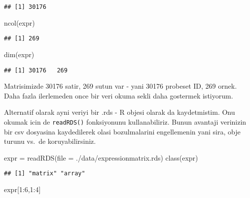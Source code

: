 \documentclass[
]{book}
\newenvironment{Shaded}{\begin{snugshade}}{\end{snugshade}}
\newcommand{\AttributeTok}[1]{\textcolor[rgb]{0.77,0.63,0.00}{#1}}
\newcommand{\DecValTok}[1]{\textcolor[rgb]{0.00,0.00,0.81}{#1}}
\newcommand{\FunctionTok}[1]{\textcolor[rgb]{0.00,0.00,0.00}{#1}}
\newcommand{\NormalTok}[1]{#1}
\newcommand{\OtherTok}[1]{\textcolor[rgb]{0.56,0.35,0.01}{#1}}
\newcommand{\SpecialCharTok}[1]{\textcolor[rgb]{0.00,0.00,0.00}{#1}}
\newcommand{\StringTok}[1]{\textcolor[rgb]{0.31,0.60,0.02}{#1}}
\begin{document}
\begin{verbatim}
## [1] 30176
\end{verbatim}

\begin{Shaded}
\begin{Highlighting}[]
\FunctionTok{ncol}\NormalTok{(expr)}
\end{Highlighting}
\end{Shaded}

\begin{verbatim}
## [1] 269
\end{verbatim}

\begin{Shaded}
\begin{Highlighting}[]
\FunctionTok{dim}\NormalTok{(expr)}
\end{Highlighting}
\end{Shaded}

\begin{verbatim}
## [1] 30176   269
\end{verbatim}

Matrisimizde 30176 satir, 269 sutun var - yani 30176 probeset ID, 269 ornek. Daha fazla ilerlemeden once bir veri okuma sekli daha gostermek istiyorum.

Alternatif olarak ayni veriyi bir .rds - R objesi olarak da kaydetmistim. Onu okumak icin de \texttt{readRDS()} fonksiyonunu kullanabiliriz. Bunun avantaji verinizin bir csv dosyasina kaydedilerek olasi bozulmalarini engellemenin yani sira, obje turunu vs.~de koruyabilirsiniz.

\begin{Shaded}
\begin{Highlighting}[]
\NormalTok{expr }\OtherTok{=} \FunctionTok{readRDS}\NormalTok{(}\AttributeTok{file =} \StringTok{\textquotesingle{}./data/expressionmatrix.rds\textquotesingle{}}\NormalTok{)}
\FunctionTok{class}\NormalTok{(expr)}
\end{Highlighting}
\end{Shaded}

\begin{verbatim}
## [1] "matrix" "array"
\end{verbatim}

\begin{Shaded}
\begin{Highlighting}[]
\NormalTok{expr[}\DecValTok{1}\SpecialCharTok{:}\DecValTok{6}\NormalTok{,}\DecValTok{1}\SpecialCharTok{:}\DecValTok{4}\NormalTok{]}
\end{Highlighting}
\end{Shaded}
\end{document}
